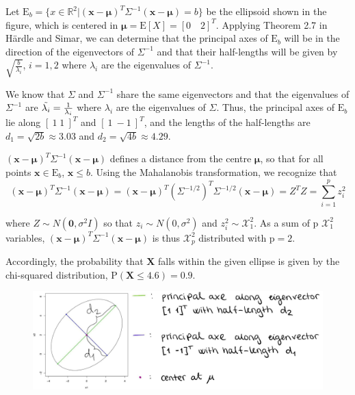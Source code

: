 Let $\text{E}_b = \{ x \in \mathbb{R}^2 | (\mathbf{x} - \mathbf{\mu})^T \Sigma^{-1}(\mathbf{x} - \mathbf{\mu}) = b \}$ be the ellipsoid shown in the figure, which is centered in $\mathbf{\mu} = \text{E}[X] = [0 \quad 2]^T$. Applying Theorem 2.7 in Härdle and Simar, we can determine that the principal axes of $\text{E}_b$ will be in the direction of the eigenvectors of $\Sigma^{-1}$ and that their half-lengths will be given by $\sqrt{\frac{b}{\lambda_i}}$, $i =1,2$ where $\lambda_i$ are the eigenvalues of $\Sigma^{-1}$.

We know that $\Sigma$ and $\Sigma^{-1}$ share the same eigenvectors and that the eigenvalues of $\Sigma^{-1}$ are  $\Tilde{\lambda_i}= \frac{1}{{\lambda_i}}$ where $\lambda_i$ are the eigenvalues of $\Sigma$. 
Thus, the principal axes of $\text{E}_b$ lie along $[\: 1 \;  1\: ]^T$ and $[\: 1 \ -1\:]^T$, and the lengths of the half-lengths are $d_1 = \sqrt{2b} \approx 3.03$ and $d_2 =  \sqrt{4b} \approx 4.29$.


$(\mathbf{x}- \mathbf{\mu})^T\Sigma^{-1} (\mathbf{x}- \mathbf{\mu})$ defines a distance from the centre $\mathbf{\mu}$, so that for all points $\mathbf{x} \in \text{E}_b$, $\mathbf{x} \leq b$. 
Using the Mahalanobis transformation, we recognize that 
\begin{equation*}
    (\mathbf{x}- \mathbf{\mu})^T\Sigma^{-1} (\mathbf{x}- \mathbf{\mu})
    = (\mathbf{x}- \mathbf{\mu})^T(\Sigma^{-1/2})^T\Sigma^{-1/2}(\mathbf{x}- \mathbf{\mu}) = Z^TZ = \sum_{i=1}^p z_i^2
\end{equation*}

where $Z \sim N(\mathbf{0}, \sigma^2 I)$ so that $z_i \sim N(0,\sigma^2)$ and $z_i^2 \sim \mathcal{X}_1^2$. As a sum of p $\mathcal{X}_1^2$ variables, $(\mathbf{x}- \mathbf{\mu})^T\Sigma^{-1} (\mathbf{x}- \mathbf{\mu})$ is thus $\mathcal{X}_p^2$ distributed with $\text{p}=2$. %

Accordingly, the probability that $\mathbf{X}$ falls within the given ellipse is given by the chi-squared distribution, $\text{P}(\mathbf{X} \leq 4.6) = 0.9$.


\begin{figure}
    \centering
    \includegraphics[width=1\textwidth]{figur1.jpg}
    \caption{}
    \label{figure}
\end{figure}